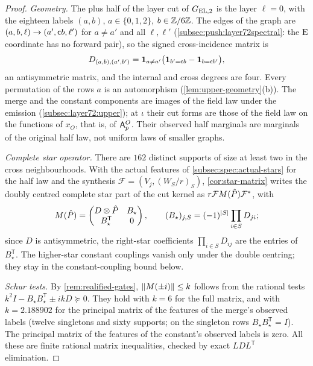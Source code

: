 \begin{proof}
\emph{Geometry.} The plus half of the layer cut of $G_{\rm EL,2}$ is the layer
$\ell=0$, with the eighteen labels $(a,b)$, $a\in\{0,1,2\}$, $b\in\mathbb Z/6\mathbb Z$. The
edges of the graph are $(a,b,\ell)\to(a',\mathsf c b,\ell')$ for $a\ne a'$ and all
$\ell,\ell'$ (\cref{subsec:push:layer72spectral}: the $\rm E$ coordinate has no
forward pair), so the signed cross-incidence matrix is
\[
 D_{(a,b),(a',b')}=\mathbf 1_{a\ne a'}\bigl(\mathbf 1_{b'=\mathsf c b}-\mathbf 1_{b=\mathsf c b'}\bigr),
\]
an antisymmetric matrix, and the internal and cross degrees are four. Every
permutation of the rows $a$ is an automorphism (\cref{lem:upper-geometry}(b)). The
merge and the constant components are images of the field law under the emission
(\cref{subsec:layer72:upper}); at $\iota$ their cut forms are those of the field
law on the functions of $x_O$, that is, of $\mathsf A_p^O$. Their observed half
marginals are marginals of the
original half law, not uniform laws of smaller graphs.

\emph{Complete star operator.} There are $162$ distinct supports of size at least
two in the cross neighbourhoods. With the actual features of
\cref{subsec:spec:actual-stars} for the half law and the synthesis
$\mathcal F=(V_j,(W_S/r)_S)$, \cref{cor:star-matrix} writes the doubly centred
complete star part of the cut kernel as $r\mathcal FM(\hat P)\mathcal F^*$, with
\[
 M(\hat P)=\begin{pmatrix}D\otimes\hat P&B_\star\\B_\star^{\mathsf T}&0\end{pmatrix},
 \qquad (B_\star)_{j,S}=(-1)^{|S|}\prod_{i\in S}D_{ji};
\]
since $D$ is antisymmetric, the right-star coefficients $\prod_{i\in S}D_{ij}$ are
the entries of $B_\star^{\mathsf T}$. The higher-star constant couplings vanish only
under the double centring; they stay in the constant-coupling bound below.

\emph{Schur tests.} By \cref{rem:realified-gates}, $\left\|M(\pm i)\right\|\le k$ follows
from the rational tests $k^2I-B_\star B_\star^{\mathsf T}\pm ikD\succeq0$. They hold
with $k=6$ for the full matrix, and with $k=2.188902$ for the principal matrix of
the features of the merge's observed labels (twelve singletons and sixty supports;
on the singleton rows $B_\star B_\star^{\mathsf T}=I$). The principal matrix of the
features of the constant's observed labels is zero. All these are finite rational
matrix inequalities, checked by exact $LDL^{\mathsf T}$ elimination.


\end{proof}
